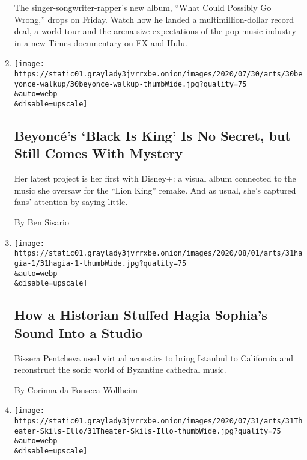 \begin{enumerate}
  The singer-songwriter-rapper's new album, ``What Could Possibly Go
  Wrong,'' drops on Friday. Watch how he landed a multimillion-dollar
  record deal, a world tour and the arena-size expectations of the
  pop-music industry in a new Times documentary on FX and Hulu.
\item
  \href{/2020/07/30/arts/music/beyonce-black-is-king.html}{}

  \texttt{[image: https://static01.graylady3jvrrxbe.onion/images/2020/07/30/arts/30beyonce-walkup/30beyonce-walkup-thumbWide.jpg?quality=75\\\&auto=webp\\\&disable=upscale]}

  \hypertarget{beyoncuxe9s-black-is-king-is-no-secret-but-still-comes-with-mystery}{%
  \subsection{Beyoncé's `Black Is King' Is No Secret, but Still Comes
  With
  Mystery}\label{beyoncuxe9s-black-is-king-is-no-secret-but-still-comes-with-mystery}}

  Her latest project is her first with Disney+: a visual album connected
  to the music she oversaw for the ``Lion King'' remake. And as usual,
  she's captured fans' attention by saying little.

  By Ben Sisario
\item
  \href{/2020/07/30/arts/music/hagia-sophia-acoustics-music.html}{}

  \texttt{[image: https://static01.graylady3jvrrxbe.onion/images/2020/08/01/arts/31hagia-1/31hagia-1-thumbWide.jpg?quality=75\\\&auto=webp\\\&disable=upscale]}

  \hypertarget{how-a-historian-stuffed-hagia-sophias-sound-into-a-studio}{%
  \subsection{How a Historian Stuffed Hagia Sophia's Sound Into a
  Studio}\label{how-a-historian-stuffed-hagia-sophias-sound-into-a-studio}}

  Bissera Pentcheva used virtual acoustics to bring Istanbul to
  California and reconstruct the sonic world of Byzantine cathedral
  music.

  By Corinna da Fonseca-Wollheim
\item
  \href{/2020/07/30/theater/theater-classes-at-home.html}{}

  \texttt{[image: https://static01.graylady3jvrrxbe.onion/images/2020/07/31/arts/31Theater-Skils-Illo/31Theater-Skils-Illo-thumbWide.jpg?quality=75\\\&auto=webp\\\&disable=upscale]}


\end{enumerate}
